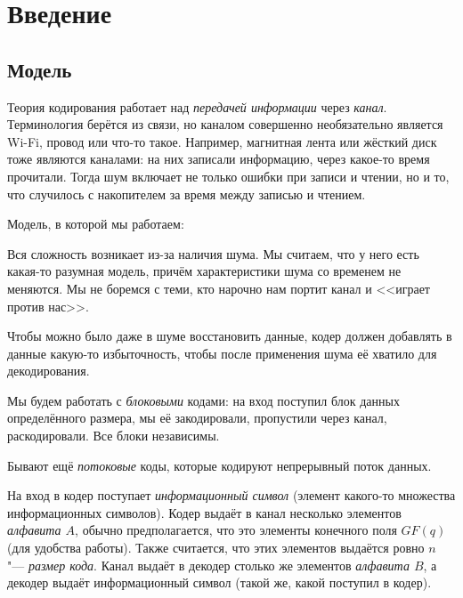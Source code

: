 
\chapter{Введение}
\section{Модель}
Теория кодирования работает над \textit{передачей информации} через \textit{канал}.
Терминология берётся из связи, но каналом совершенно необязательно является
Wi-Fi, провод или что-то такое.
Например, магнитная лента или жёсткий диск тоже являются каналами: на них записали информацию,
через какое-то время прочитали.
Тогда шум включает не только ошибки при записи и чтении, но и то, что случилось с
накопителем за время между записью и чтением.

\begin{Def}
	Модель, в которой мы работаем:

	\centerline{
	}
\end{Def}

Вся сложность возникает из-за наличия шума.
Мы считаем, что у него есть какая-то разумная модель,
причём характеристики шума со временем не меняются.
Мы не боремся с теми, кто нарочно нам портит канал и <<играет против нас>>.

Чтобы можно было даже в шуме восстановить данные, кодер должен добавлять в данные
какую-то избыточность, чтобы после применения шума её хватило для декодирования.

\begin{Def}
	Мы будем работать с \textit{блоковыми} кодами: на вход поступил блок данных определённого размера,
	мы её закодировали, пропустили через канал, раскодировали.
	Все блоки независимы.
\end{Def}
\begin{Rem}
	Бывают ещё \textit{потоковые} коды, которые кодируют непрерывный поток данных.
\end{Rem}

\begin{Def}
	На вход в кодер поступает \textit{информационный символ} (элемент какого-то множества информационных символов).
	Кодер выдаёт в канал несколько элементов \textit{алфавита $A$}, обычно предполагается,
	что это элементы конечного поля $GF(q)$ (для удобства работы).
	Также считается, что этих элементов выдаётся ровно $n$ "--- \textit{размер кода}.
	Канал выдаёт в декодер столько же элементов \textit{алфавита $B$}, а декодер выдаёт информационный символ
	(такой же, какой поступил в кодер).
\end{Def}

